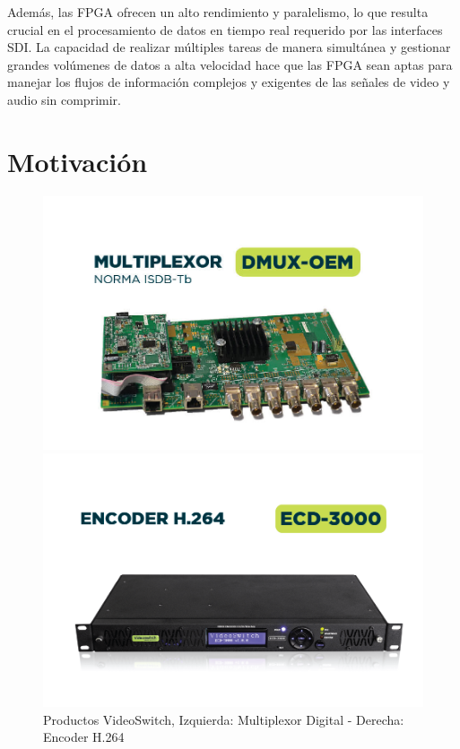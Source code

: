 Además, las FPGA ofrecen un alto rendimiento y paralelismo, lo que resulta
crucial en el procesamiento de datos en tiempo real requerido por las interfaces
SDI. La capacidad de realizar múltiples tareas de manera simultánea y gestionar
grandes volúmenes de datos a alta velocidad hace que las FPGA sean aptas para
manejar los flujos de información complejos y exigentes de las señales de video
y audio sin comprimir.

\section{Motivación}

\vspace{1cm}
\begin{figure}[htbp]
    \centering
    \begin{minipage}{.45\linewidth}
        \includegraphics[width=\linewidth]{./Figures/DMUX-OEM.jpg}
    \end{minipage}
    \hspace{.05\linewidth}
    \begin{minipage}{.45\linewidth}
        \includegraphics[width=\linewidth]{./Figures/ECD-3000.png}
    \end{minipage}
    \caption{Productos VideoSwitch, Izquierda: Multiplexor Digital - Derecha: Encoder H.264}
        \label{fig:vs-mux-ecd}
\end{figure}
\vspace{1cm}

